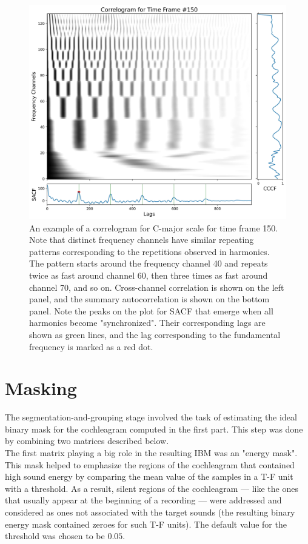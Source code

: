 \begin{figure}[t]
	\centering
	\includegraphics[width=\textwidth]{include/correlogram_example}
	\caption[An example of correlogram and the extracted features for C-major scale]{An example of a correlogram for C-major scale for time frame 150. Note that distinct frequency channels have similar repeating patterns corresponding to the repetitions observed in harmonics. The pattern starts around the frequency channel 40 and repeats twice as fast around channel 60, then three times as fast around channel 70, and so on. Cross-channel correlation is shown on the left panel, and the summary autocorrelation is shown on the bottom panel. Note the peaks on the plot for SACF that emerge when all harmonics become "synchronized". Their corresponding lags are shown as green lines, and the lag corresponding to the fundamental frequency is marked as a red dot.}
	\label{img:correlogram_example}
\end{figure}

\section{Masking}

The segmentation-and-grouping stage involved the task of estimating the ideal binary mask for the cochleagram computed in the first part. This step was done by combining two matrices described below.\\

The first matrix playing a big role in the resulting IBM was an "energy mask". This mask helped to emphasize the regions of the cochleagram that contained high sound energy by comparing the mean value of the samples in a T-F unit with a threshold. As a result, silent regions of the cochleagram --- like the ones that usually appear at the beginning of a recording --- were addressed and considered as ones not associated with the target sounds (the resulting binary energy mask contained zeroes for such T-F units). The default value for the threshold was chosen to be $0.05$.\\

